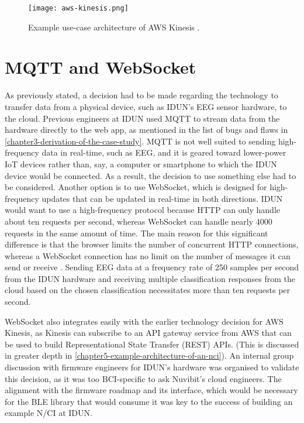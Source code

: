 \begin{figure}[!ht]
  \centering
  \texttt{[image: aws-kinesis.png]}
  \caption[Example use-case architecture of AWS Kinesis.]{Example use-case architecture of AWS Kinesis \citep{amazon_web_services_inc_amazon_nodate}.}
  \label{fig:aws-kinesis}
\end{figure}

\section*{MQTT and WebSocket}
\label{chapter4-mqtt-and-websocket}

As previously stated, a decision had to be made regarding the technology to transfer data from a physical device, such as IDUN’s EEG sensor hardware, to the cloud. Previous engineers at IDUN used MQTT to stream data from the hardware directly to the web app, as mentioned in the list of bugs and flaws in \autoref{chapter3-derivation-of-the-case-study}. MQTT is not well suited to sending high-frequency data in real-time, such as EEG, and it is geared toward lower-power IoT devices rather than, say, a computer or smartphone to which the IDUN device would be connected. As a result, the decision to use something else had to be considered. Another option is to use WebSocket, which is designed for high-frequency updates that can be updated in real-time in both directions. IDUN would want to use a high-frequency protocol because HTTP can only handle about ten requests per second, whereas WebSocket can handle nearly 4000 requests in the same amount of time. The main reason for this significant difference is that the browser limits the number of concurrent HTTP connections, whereas a WebSocket connection has no limit on the number of messages it can send or receive \citep{luecke_http_2018}. Sending EEG data at a frequency rate of 250 samples per second from the IDUN hardware and receiving multiple classification responses from the cloud based on the chosen classification necessitates more than ten requests per second.

WebSocket also integrates easily with the earlier technology decision for AWS Kinesis, as Kinesis can subscribe to an API gateway service from AWS that can be used to build Representational State Transfer (REST) APIs. (This is discussed in greater depth in \autoref{chapter5-example-architecture-of-an-nci}). An internal group discussion with firmware engineers for IDUN’s hardware was organised to validate this decision, as it was too BCI-specific to ask Nuvibit’s cloud engineers. The alignment with the firmware roadmap and its interface, which would be necessary for the BLE library that would consume it was key to the success of building an example N/CI at IDUN.

